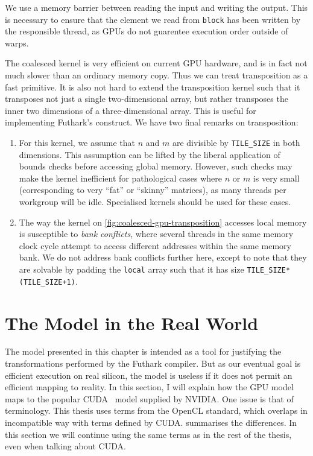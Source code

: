 We use a memory barrier between reading the input and writing the
output.  This is necessary to ensure that the element we read from
\texttt{block} has been written by the responsible thread, as GPUs do
not guarentee execution order outside of warps.

The coalesced kernel is very efficient on current GPU hardware, and is
in fact not much slower than an ordinary memory copy.  Thus we can
treat transposition as a fast primitive.  It is also not hard to
extend the transposition kernel such that it transposes not just a
single two-dimensional array, but rather transposes the inner two
dimensions of a three-dimensional array.  This is useful for
implementing Futhark's  construct.  We have two final
remarks on transposition:

\begin{enumerate}
\item For this kernel, we assume that $n$ and $m$ are divisible by
  \texttt{TILE\_SIZE} in both dimensions.  This assumption can be
  lifted by the liberal application of bounds checks before accessing
  global memory.  However, such checks may make the kernel inefficient
  for pathological cases where $n$ or $m$ is very small (corresponding
  to very ``fat'' or ``skinny'' matrices), as many threads per
  workgroup will be idle.  Specialised kernels should be used for
  these cases.
\item The way the kernel on \cref{fig:coalesced-gpu-transposition}
  accesses local memory is susceptible to \textit{bank conflicts},
  where several threads in the same memory clock cycle attempt to
  access different addresses within the same memory bank.  We do not
  address bank conflicts further here, except to note that they are
  solvable by padding the \texttt{local} array such that it has size
  \texttt{TILE\_SIZE*(TILE\_SIZE+1)}.
\end{enumerate}

\section{The Model in the Real World}
\label{sec:gpu-model-real-world}

The model presented in this chapter is intended as a tool for
justifying the transformations performed by the Futhark compiler.  But
as our eventual goal is efficient execution on real silicon, the model
is useless if it does not permit an efficient mapping to reality.  In
this section, I will explain how the GPU model maps to the popular
CUDA~\cite{cuda} model supplied by NVIDIA.  One issue is that of
terminology.  This thesis uses terms from the OpenCL standard, which
overlaps in incompatible way with terms defined by CUDA.
 summarises the differences.  In this section we
will continue using the same terms as in the rest of the thesis, even
when talking about CUDA.

